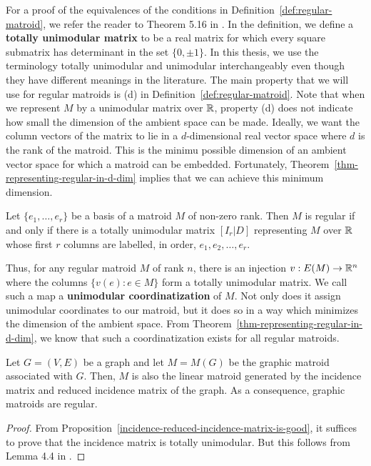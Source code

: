 \documentclass{puthesis-UG}
\begin{document}
For a proof of the equivalences of the conditions in Definition~\ref{def:regular-matroid}, we refer the reader to Theorem 5.16 in \cite{10.5555/1197093}. In the definition, we define a \textbf{totally unimodular matrix} to be a real matrix for which every square submatrix has determinant in the set $\{0, \pm 1\}$. In this thesis, we use the terminology totally unimodular and unimodular interchangeably even though they have different meanings in the literature. The main property that we will use for regular matroids is (d) in Definition~\ref{def:regular-matroid}. Note that when we represent $M$ by a unimodular matrix over $\mathbb{R}$, property (d) does not indicate how small the dimension of the ambient space can be made. Ideally, we want the column vectors of the matrix to lie in a $d$-dimensional real vector space where $d$ is the rank of the matroid. This is the minimu possible dimension of an ambient vector space for which a matroid can be embedded. Fortunately, Theorem~\ref{thm-representing-regular-in-d-dim} implies that we can achieve this minimum dimension.

\begin{thm} \label{thm-representing-regular-in-d-dim}
	Let $\{e_1, \ldots, e_r\}$ be a basis of a matroid $M$ of non-zero rank. Then $M$ is regular if and only if there is a totally unimodular matrix $[I_r | D]$ representing $M$ over $\mathbb{R}$ whose first $r$ columns are labelled, in order, $e_1, e_2, \ldots, e_r$. 
\end{thm}

Thus, for any regular matroid $M$ of rank $n$, there is an injection $v : E(M) \to \mathbb{R}^n$ where the columns $\{v(e) : e \in M\}$ form a totally unimodular matrix. We call such a map a \textbf{unimodular coordinatization} of $M$. Not only does it assign unimodular coordinates to our matroid, but it does so in a way which minimizes the dimension of the ambient space. From Theorem~\ref{thm-representing-regular-in-d-dim}, we know that such a coordinatization exists for all regular matroids. 

\begin{prop} \label{graphic-matroid-is-regular-prop}
	Let $G = (V, E)$ be a graph and let $M = M(G)$ be the graphic matroid associated with $G$. Then, $M$ is also the linear matroid generated by the incidence matrix and reduced incidence matrix of the graph. As a consequence, graphic matroids are regular.
\end{prop}

\begin{proof}
	From Proposition~\ref{incidence-reduced-incidence-matrix-is-good}, it suffices to prove that the incidence matrix is totally unimodular. But this follows from Lemma 4.4 in \cite{fujishige}. 
\end{proof}
\end{document}
